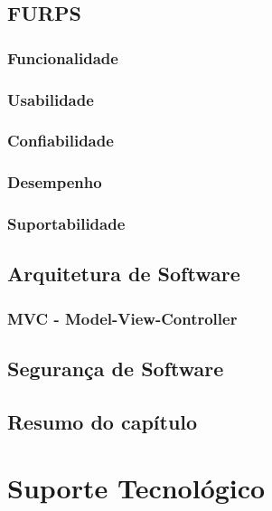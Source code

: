 \section{FURPS}
\label{sec:furps}

\subsection{Funcionalidade}
\label{subsec:funcionalidade}

\subsection{Usabilidade}
\label{subsec:usabilidade}

\subsection{Confiabilidade}
\label{subsec:confiabilidade}

\subsection{Desempenho}
\label{subsec:desempenho}

\subsection{Suportabilidade}
\label{subsec:suportabilidade}

\section{Arquitetura de Software}
\label{sec:arquitetura}

\subsection{MVC - Model-View-Controller}
\label{subsec:mvc}

\section{Segurança de Software}
\label{sec:seguranca}

\section{Resumo do capítulo}


\chapter{Suporte Tecnológico}

